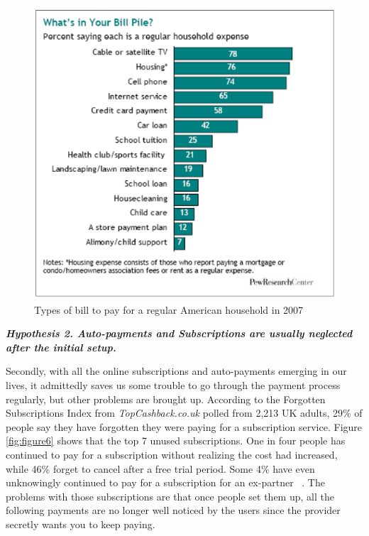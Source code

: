 \documentclass{sigchi}
\begin{document}
\begin{figure}[h!]
\centering
  \includegraphics[width=0.9\columnwidth]{types-of-bills.png}
  \caption{Types of bill to pay for a regular American household in 2007}
  \label{fig:figure5}
\end{figure}

\textbf{\textit{Hypothesis 2. Auto-payments and Subscriptions are usually neglected after the initial setup.}}

Secondly, with all the online subscriptions and auto-payments emerging in our lives, it admittedly saves us some trouble to go through the payment process regularly, but other problems are brought up. According to the Forgotten Subscriptions Index from \textit{TopCashback.co.uk} polled from 2,213 UK adults, 29\% of people say they have forgotten they were paying for a subscription service. Figure \ref{fig:figure6} shows that the top 7 unused subscriptions. One in four people has continued to pay for a subscription without realizing the cost had increased, while 46\% forget to cancel after a free trial period. Some 4\% have even unknowingly continued to pay for a subscription for an ex-partner ~\cite{CAYPS}. The problems with those subscriptions are that once people set them up, all the following payments are no longer well noticed by the users since the provider secretly wants you to keep paying.
\end{document}
